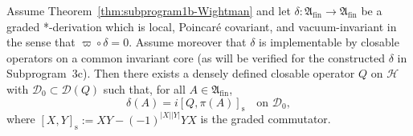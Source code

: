 \begin{proposition}
\label{prop:inner}
Assume Theorem~\ref{thm:subprogram1b-Wightman} and let
$\delta:\mathfrak A_{\mathrm{fin}}\to \mathfrak A_{\mathrm{fin}}$ be a graded
*-derivation which is local, Poincar\'e covariant, and vacuum-invariant in the
sense that $\varpi\circ\delta=0$.  Assume moreover that $\delta$ is implementable
by closable operators on a common invariant core (as will be verified for the
constructed $\delta$ in Subprogram~3c). Then there exists a densely defined
closable operator $Q$ on $\mathcal H$ with $\mathcal D_0\subset\mathcal D(Q)$ such
that, for all $A\in\mathfrak A_{\mathrm{fin}}$,
\[
\delta(A)=i[Q,\pi(A)]_{\mathrm s}\quad\text{on }\mathcal D_0,
\]
where $[X,Y]_{\mathrm s}:=XY-(-1)^{|X||Y|}YX$ is the graded commutator.
\end{proposition}

